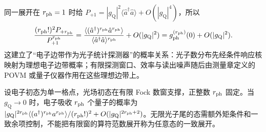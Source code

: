同一展开在 $r_{\rm ph}=1$ 时给
$P_{+1}=|g_{\mathrm Q}|^2\langle \hat a^\dagger\hat a\rangle+O(|g_{\mathrm Q}|^4)$，所以
\begin{equation*}
\frac{(r_{\rm ph}!)^2P_{+r_{\rm ph}}}{P_{+1}^{r_{\rm ph}}}
=\frac{\langle(\hat a^\dagger)^{r_{\rm ph}}\hat a^{r_{\rm ph}}\rangle}
{\langle \hat a^\dagger\hat a\rangle^{r_{\rm ph}}}+O(|g_{\mathrm Q}|^2)
=g_{\rm ph}^{(r_{\rm ph})}(0)+O(|g_{\mathrm Q}|^2).
\end{equation*}
这建立了“电子边带作为光子统计探测器”的概率关系：光子数分布先经条件响应核映射为理想电子边带概率；有限探测窗口、效率与读出噪声随后由测量章定义的 POVM 或量子仪器作用在这些理想边带上。

\begin{proposition}[弱交换的光子阶乘矩]
设电子初态为单一格点，光场初态在有限 Fock 数窗支撑，正整数 $r_{\rm ph}$ 固定。当 $g_{\mathrm Q}\to0$ 时，电子吸收 $r_{\rm ph}$ 个量子的概率为 $|g_{\mathrm Q}|^{2r_{\rm ph}}\langle(a^\dagger)^{r_{\rm ph}}a^{r_{\rm ph}}\rangle/(r_{\rm ph}!)^2+O(|g_{\mathrm Q}|^{2r_{\rm ph}+2})$。无限光子尾的态需额外矩条件和一致余项控制，不能把有限窗的算符范数展开称为任意态的一致展开。
\end{proposition}
